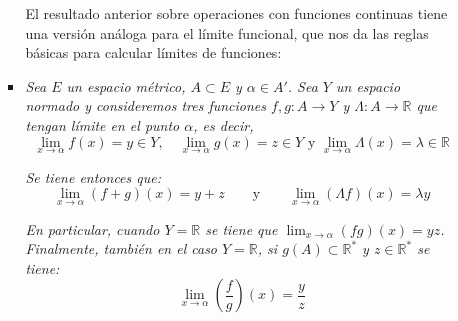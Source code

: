 \documentclass[a4paper, 12pt]{article}
\begin{document}
\begin{enumerate}[label=\textbf{\arabic*}.]
\begin{enumerate}[label=\textit{\alph*})]
\begin{itemize}
El resultado anterior sobre operaciones con funciones continuas tiene una versión análoga para el límite funcional, que nos da las reglas básicas para calcular límites de funciones:
	\item \textit{Sea \(E\) un espacio métrico, \(A \subset E\) y \(\alpha \in A'\). Sea \(Y\) un espacio normado y consideremos tres funciones \(f,g: A \rightarrow Y\) y \(\Lambda : A \rightarrow \mathbb{R}\) que tengan límite en el punto \(\alpha\), es decir,}
\[
	\lim_{x \to \alpha} f(x) = y \in Y, \quad \lim_{x \to \alpha} g(x) = z \in Y \text{  y  } \lim_{x \to \alpha} \Lambda (x) = \lambda \in \mathbb{R}
\]

\textit{Se tiene entonces que:}
\[
	\lim_{x \to \alpha} (f+g)(x) = y+z \qquad \text{y} \qquad \lim_{x \to \alpha} (\Lambda f) (x) = \lambda y
\]

\textit{En particular, cuando \(Y = \mathbb{R}\) se tiene que \(\lim_{x \to \alpha} (fg) (x) = yz\). Finalmente, también en el caso \(Y = \mathbb{R}\), si \(g(A) \subset \mathbb{R}^*\) y \(z \in \mathbb{R}^*\) se tiene:}
\[
	\lim_{x \to \alpha} \left( \frac{f}{g} \right) (x) = \frac{y}{z}
\]
	\end{itemize}
\end{enumerate}
\end{enumerate}
\end{document}

